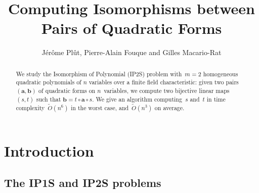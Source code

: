 \documentclass{lms}
\title[Pairs of quadratic forms]%
{Computing Isomorphisms between Pairs of Quadratic Forms}
\author[J. Plût, P.-A. Fouque and G. Macario-Rat]%
{Jérôme Plût, Pierre-Alain Fouque and Gilles Macario-Rat}
\def\Ot{\widetilde{O}}
\begin{document}
\maketitle
\begin{abstract}%
We study the Isomorphism of Polynomial (IP2S) problem
with~$m=2$ homogeneous quadratic polynomials of $n$ variables over a finite field
characteristic: given two pairs~$(\bm{a}, \bm{b})$
of quadratic forms on $n$~variables,
we compute two bijective linear maps $(s,t)$ such that
$\bm{b}=t\circ \bm{a}\circ s$.
We give an algorithm computing~$s$ and~$t$
in time complexity~$\Ot(n^6)$ in the worst case,
and~$\Ot(n^3)$ on average.
% 
% 
\end{abstract}%
\maketitle
\section*{Introduction}
\subsection*{The IP1S and IP2S problems}
\end{document}
